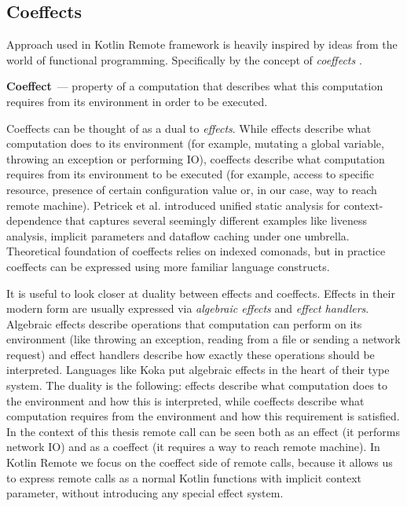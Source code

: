 \documentclass[a4paper,11pt,oneside]{article}
\newcommand{\term}[1]{\textit{#1}}
\newcommand{\makedefinition}[3][]{\textbf{#2}\ifthenelse{\equal{#1}{}}{}{~(#1)}~--- #3.}
\begin{document}
\subsection{Coeffects}

Approach used in Kotlin Remote framework is heavily inspired by ideas from the world of functional
programming. Specifically by the concept of \term{coeffects}
\cite{petricek_coeffects_2013}\cite{noauthor_coeffects_nodate}.

\makedefinition{Coeffect}{property of a computation that describes what this computation requires
from its environment in order to be executed}

Coeffects can be thought of as a dual to \term{effects}. While effects describe what computation
does to its environment (for example, mutating a global variable, throwing an exception or
performing IO), coeffects describe what computation requires from its environment to be executed
(for example, access to specific resource, presence of certain configuration value or, in our case,
way to reach remote machine). Petricek et al. \cite{petricek_coeffects_2013} introduced unified
static analysis for context-dependence that captures several seemingly different examples like
liveness analysis, implicit parameters and dataflow caching under one umbrella. Theoretical
foundation of coeffects relies on indexed comonads, but in practice coeffects can be expressed
using more familiar language constructs.

It is useful to look closer at duality between effects and coeffects. Effects in their
modern form are usually expressed via \term{algebraic effects} \cite{plotkin_handlers_2009} and
\term{effect handlers}. Algebraic effects describe operations that computation can perform on its
environment (like throwing an exception, reading from a file or sending a network request) and
effect handlers describe how exactly these operations should be interpreted. Languages like Koka
\cite{leijen_koka_nodate} put algebraic effects in the heart of their type system. The duality is
the following: effects describe what computation does to the environment and how this is
interpreted, while coeffects describe what computation requires from the environment and how this
requirement is satisfied. In the context of this thesis remote call can be seen both as an effect
(it performs network IO) and as a coeffect (it requires a way to reach remote machine). In
Kotlin Remote we focus on the coeffect side of remote calls, because it allows us to express
remote calls as a normal Kotlin functions with implicit context parameter, without introducing
any special effect system.
\end{document}
